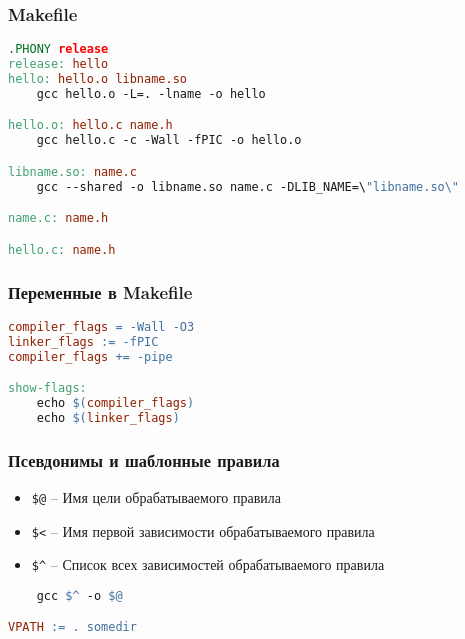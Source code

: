 \begin{frame}[fragile]
	\frametitle{Makefile}

	\begin{lstlisting}[language=make]
.PHONY release
release: hello
hello: hello.o libname.so
    gcc hello.o -L=. -lname -o hello

hello.o: hello.c name.h
    gcc hello.c -c -Wall -fPIC -o hello.o

libname.so: name.c
    gcc --shared -o libname.so name.c -DLIB_NAME=\"libname.so\"

name.c: name.h

hello.c: name.h
	\end{lstlisting}
\end{frame}


\begin{frame}[fragile]
	\frametitle{Переменные в Makefile}
	\begin{lstlisting}[language=make]
compiler_flags = -Wall -O3
linker_flags := -fPIC
compiler_flags += -pipe

show-flags:
    echo $(compiler_flags)
    echo $(linker_flags)
	\end{lstlisting}
\end{frame}
\begin{frame}[fragile]
	\frametitle{Псевдонимы и шаблонные правила}

	\begin{itemize}
		\item {\tt \$@} -- Имя цели обрабатываемого правила
		\item {\tt \$<} -- Имя первой зависимости обрабатываемого правила 
		\item {\tt \$\^{}} -- Список всех зависимостей обрабатываемого правила
	\end{itemize}

	\begin{lstlisting}[language=make]
%.o: %.c
    gcc $^ -o $@

VPATH := . somedir
	\end{lstlisting}
\end{frame}

